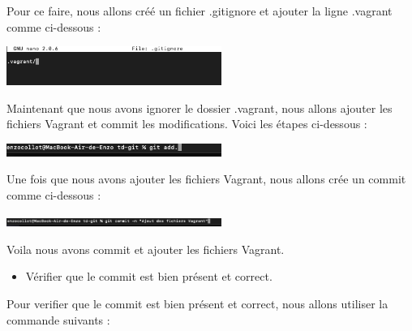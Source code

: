 \documentclass[12pt]{article}
\begin{document}
Pour ce faire, nous allons créé un fichier .gitignore et ajouter la ligne .vagrant comme ci-dessous : 

\vspace{0.3cm}

\begin{center}
  \includegraphics[width=7cm]{Image-TD-Git-1/gitignore.png}
\end{center}

\vspace{0.3cm}

Maintenant que nous avons ignorer le dossier .vagrant, nous allons ajouter les fichiers Vagrant et commit les modifications. Voici les étapes ci-dessous : 

\vspace{0.3cm}

\begin{center}
  \includegraphics[width=7cm]{Image-TD-Git-1/git add.png}
\end{center}

Une fois que nous avons ajouter les fichiers Vagrant, nous allons crée un commit comme ci-dessous : 

\vspace{0.3cm}

\begin{center}
  \includegraphics[width=7cm]{Image-TD-Git-1/git commit.png}
\end{center}

\vspace{0.3cm}

Voila nous avons commit et ajouter les fichiers Vagrant.

\vspace{0.3cm}

\begin{itemize}
  \item Vérifier que le commit est bien présent et correct.
\end{itemize}

\vspace{0.3cm}

Pour verifier que le commit est bien présent et correct, nous allons utiliser la commande suivants : 
\end{document}
